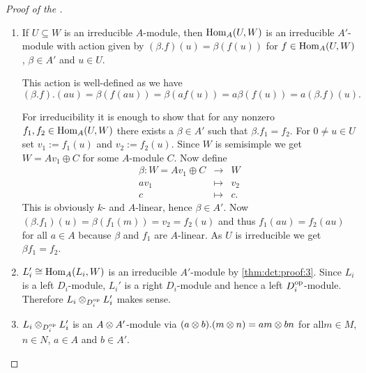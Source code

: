\documentclass[12pt,a4paper]{scrartcl}
\theoremstyle{cplain}
\theoremstyle{cplain}
\theoremstyle{cplain}
\theoremstyle{definition}
\begin{document}
\begin{otherlanguage}{english}
\begin{proof}[Proof of the ]
\begin{enumerate}[label=\arabic*.]
    Using the ,  and \eqref{eq:dct} we get an isomorphism of algebras
    \begin{align*} A' &= \set{b\in\End_k(W) \given \forall a \in A\colon ba = ab} = \End_A(W) \\&\cong \prod_{i=1}^s \Mat{n_i}{\End_A(L_i)} = \prod_{i=1}^S \Mat{n_i}{D_i} \end{align*} where $D_i := \End_A(L_i)$ are division algebras. By \cref{cor:V.20} $A'$ is semisimple and $\abs{\Irr(A')} = \abs{\Irr(A)}$.
    \item \label{thm:dct:proof:3} If $U\subseteq W$ is an irreducible $A$-module, then $\operatorname{Hom}_A(U,W)$ is an irreducible $A'$-module with action given by $(\beta.f)(u) = \beta(f(u))$ for $f\in\operatorname{Hom}_A(U,W)$, $\beta\in A'$ and $u\in U$.
    
    This action is well-defined as we have \[(\beta.f).(au) = \beta(f(au)) = \beta(af(u)) = a\beta(f(u)) = a (\beta.f)(u) .\]
    
    For irreducibility it is enough to show that for any nonzero $f_1,f_2 \in\operatorname{Hom}_A(U,W)$ there exists a $\beta\in A'$ such that $\beta .f_1=f_2$. For $0\neq u\in U$ set $v_1 := f_1(u)$ and $v_2 := f_2(u)$. Since $W$ is semisimple we get $W = Av_1 \oplus C$ for some $A$-module $C$. Now define
    \begin{eqnarray*}
      \beta\colon W = Av_1 \oplus C &\to& W \\
      av_1 &\mapsto& v_2 \\
      c &\mapsto& c.
    \end{eqnarray*}
    This is obviously $k$- and $A$-linear, hence $\beta\in A'$. Now $(\beta.f_1)(u) =\beta(f_1(m)) = v_2 = f_2(u)$ and thus $f_1(au) = f_2(au)$ for all $a\in A$ because $\beta$ and $f_1$ are $A$-linear. As $U$ is irreducible we get $\beta f_1 = f_2$.
    \item $L_i' \cong \operatorname{Hom}_A(L_i,W)$ is an irreducible $A'$-module by \ref{thm:dct:proof:3}. Since $L_i$ is a left $D_i$-module, $L_i'$ is a right $D_i$-module and hence a left $D_i^{\operatorname{op}}$-module. Therefore $L_i\otimes_{D_i^{\operatorname{op}}}L_i'$ makes sense.
    \item $L_i \otimes_{D_i^{\operatorname{op}}} L_i'$ is an $A\otimes A'$-module via $(a\otimes b) . (m\otimes n) = am\otimes bn$ for all$m\in M$, $n\in N$, $a\in A$ and $b\in A'$.
    

\end{enumerate}
\end{proof}
\end{otherlanguage}
\end{document}
